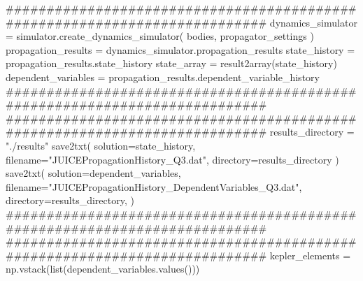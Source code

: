 {}
\markdownRendererSectionEnd \markdownRendererSectionBegin
{}\markdownRendererInterblockSeparator
{}###########################################################################\markdownRendererInterblockSeparator
{}
\markdownRendererSectionEnd \markdownRendererSectionBegin
{}\markdownRendererInterblockSeparator
{}dynamics_simulator = simulator.create_dynamics_simulator( bodies, propagator_settings )\markdownRendererInterblockSeparator
{}
\markdownRendererSectionEnd \markdownRendererSectionBegin
{}\markdownRendererInterblockSeparator
{}propagation_results = dynamics_simulator.propagation_results\markdownRendererInterblockSeparator
{}
\markdownRendererSectionEnd \markdownRendererSectionBegin
{}\markdownRendererInterblockSeparator
{}state_history = propagation_results.state_history state_array = result2array(state_history) dependent_variables = propagation_results.dependent_variable_history\markdownRendererInterblockSeparator
{}###########################################################################\markdownRendererInterblockSeparator
{}
\markdownRendererSectionEnd \markdownRendererSectionBegin
{}\markdownRendererInterblockSeparator
{}########################################################################### results_directory = "./results" save2txt( solution=state_history, filename="JUICEPropagationHistory_Q3.dat", directory=results_directory ) save2txt( solution=dependent_variables, filename="JUICEPropagationHistory_DependentVariables_Q3.dat", directory=results_directory, )\markdownRendererInterblockSeparator
{}###########################################################################\markdownRendererInterblockSeparator
{}
\markdownRendererSectionEnd \markdownRendererSectionBegin
{}\markdownRendererInterblockSeparator
{}###########################################################################\markdownRendererInterblockSeparator
{}
\markdownRendererSectionEnd \markdownRendererSectionBegin
{}\markdownRendererInterblockSeparator
{}kepler_elements = np.vstack(list(dependent_variables.values()))\markdownRendererInterblockSeparator
{}
\markdownRendererSectionEnd \markdownRendererSectionBegin
{}\markdownRendererInterblockSeparator
